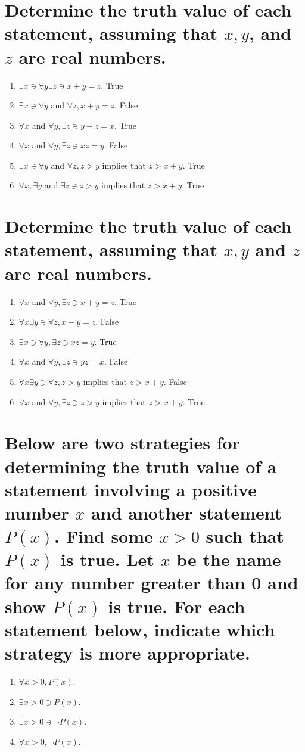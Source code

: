 \documentclass[11pt]{article} %
\begin{document}
\section{Determine the truth value of each statement, assuming that $x,y$, and $z$ are real numbers.}
\begin{enumerate}
\item $\exists x\ni\forall y \exists z\ni x+y=z$.
\subitem True
\item $\exists x \ni\forall y$ and $\forall z, x+y=z$.
\subitem False
\item $\forall x$ and $\forall y,\exists z \ni y-z=x$.
\subitem True
\item $\forall x$ and $\forall y,\exists z \ni xz=y$.
\subitem False
\item $\exists x \ni \forall y$ and $\forall z, z>y$ implies that $z>x+y$.
\subitem True
\item $\forall x, \exists y$ and $\exists z \ni z>y$ implies that $z>x+y$.
\subitem True
\end{enumerate}

\section{Determine the truth value of each statement, assuming that $x,y$ and $z$ are real numbers.}
\begin{enumerate}
\item $\forall x$ and $\forall y, \exists z \ni x+y=z$.
\subitem True
\item $\forall x \exists y \ni \forall z, x+y=z$.
\subitem False
\item $\exists x \ni \forall y, \exists z \ni xz=y$.
\subitem True
\item $\forall x$ and $\forall y, \exists z \ni yz=x$.
\subitem False
\item $\forall x \exists y \ni \forall z, z>y$ implies that $ z>x+y$.
\subitem False
\item $\forall x$ and $\forall y, \exists z \ni z>y$ implies that $z>x+y$.
\subitem True
\end{enumerate}

\section{Below are two strategies for determining the truth value of a statement involving a positive number $x$ and another statement $P(x)$.
Find some $x>0$ such that $P(x)$ is true.
Let $x$ be the name for any number greater than 0 and show $P(x)$ is true.
For each statement below, indicate which strategy is more appropriate.}
\begin{enumerate}
\item $\forall x>0, P(x)$.
\item $\exists x>0 \ni P(x)$.
\item $\exists x>0 \ni \neg P(x)$.
\item $\forall x>0, \neg P(x)$.
\end{enumerate}
\end{document}
